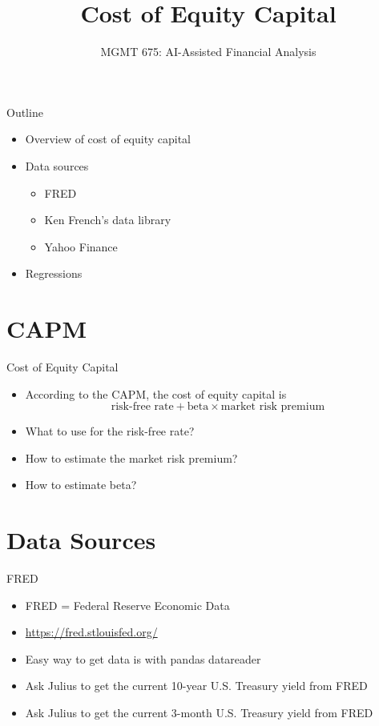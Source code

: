 \documentclass[10pt]{beamer}
\title{Cost of Equity Capital}
\subtitle{MGMT 675: AI-Assisted Financial Analysis}
\date{}
\begin{document}
\begin{frame}[plain]
\titlepage
\end{frame}

\begin{frame}{Outline}
\begin{itemize}
\item Overview of cost of equity capital
\item Data sources
  \begin{itemize}
  \item FRED
  \item Ken French's data library 
  \item Yahoo Finance
  \end{itemize}
\item Regressions
\end{itemize}
\end{frame}

\section{CAPM}
\begin{frame}{Cost of Equity Capital}
\begin{itemize}
\item According to the CAPM, the cost of equity capital is
$$\text{risk-free rate} + \text{beta} \times \text{market risk premium}$$
\item What to use for the risk-free rate?
\item How to estimate the market risk premium?
\item How to estimate beta?
\end{itemize}
\end{frame}

\section{Data Sources}
\begin{frame}{FRED}
\begin{itemize}
\item FRED = Federal Reserve Economic Data
\item \href{https://fred.stlouisfed.org/}{https://fred.stlouisfed.org/}
\item Easy way to get data is with pandas datareader
\item Ask Julius to get the current 10-year U.S. Treasury yield from FRED
\item Ask Julius to get the current 3-month U.S. Treasury yield from FRED
\end{itemize}
\end{frame}
\end{document}
